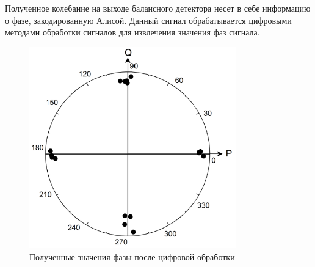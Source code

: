 Полученное колебание на выходе балансного детектора несет в себе информацию о фазе, закодированную Алисой. Данный сигнал обрабатывается цифровыми методами обработки сигналов для извлечения значения фаз сигнала. 
\begin{figure}
    \centering
    \includegraphics[width=0.8\textwidth]{images/06.png}
    \caption{Полученные значения фазы после цифровой обработки}
    \label{fig:phase meas ijnect}
\end{figure}

